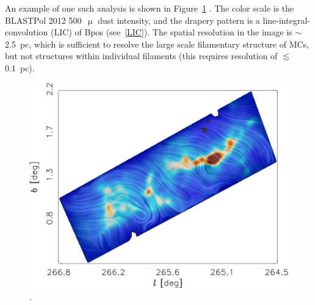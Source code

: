 An example of one such analysis is shown in Figure~\ref{fig:vela2012} \citep{fissel2016balloon}. The color scale is the BLASTPol 2012 500~$\upmu$ dust intensity, and the drapery pattern is a line-integral-convolution (LIC) of \gls{Bpos} (see~\ref{LIC}). The spatial resolution in the image is $\sim$2.5~pc, which is sufficient to resolve the large scale filamentary structure of MCs, but not structures within individual filaments (this requires resolution of $\lesssim$0.1~pc).

\begin{figure}[!htbp]
\centering
\includegraphics[width=\textwidth]{figures/intro/velac_lic}
\caption[~An LIC map of Vela C, from BLASTPol  2012.]{\citet{fissel2016balloon}.}
\label{fig:vela2012}
\end{figure}

